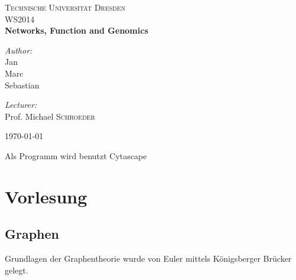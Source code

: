 \documentclass{article}
\begin{document}
\setlength\parindent{0pt}

\begin{titlepage}
\begin{center}


\textsc{\LARGE Technische Universität Dresden}\\[1.5cm]

\textsc{\Large WS2014}\\[0.5cm]

{ \huge \bfseries Networks, Function and Genomics\\[0.4cm] }

\noindent
\begin{minipage}{0.4\textwidth}
\begin{flushleft} \large
\emph{Author:}\\
Jan\\
Marc\\
Sebastian\\
\end{flushleft}
\end{minipage}%
\begin{minipage}{0.4\textwidth}
\begin{flushright} \large
\emph{Lecturer:} \\
Prof. Michael \textsc{Schroeder}
\end{flushright}
\end{minipage}

\vfill

{\large \today}

\end{center}
\end{titlepage}

Als Programm wird benutzt
Cytascape

\section{Vorlesung}

\subsection{Graphen}
Grundlagen der Graphentheorie wurde von Euler mittels Königsberger Brücker gelegt.
\\
\\ 
\end{document}
